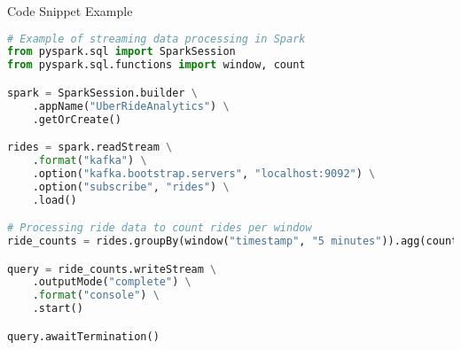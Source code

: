 \documentclass[aspectratio=169]{beamer}
\begin{document}
\begin{frame}[fragile]{Code Snippet Example}
\begin{lstlisting}[language=Python]
# Example of streaming data processing in Spark
from pyspark.sql import SparkSession
from pyspark.sql.functions import window, count

spark = SparkSession.builder \
    .appName("UberRideAnalytics") \
    .getOrCreate()

rides = spark.readStream \
    .format("kafka") \
    .option("kafka.bootstrap.servers", "localhost:9092") \
    .option("subscribe", "rides") \
    .load()

# Processing ride data to count rides per window
ride_counts = rides.groupBy(window("timestamp", "5 minutes")).agg(count("ride_id").alias("total_rides"))

query = ride_counts.writeStream \
    .outputMode("complete") \
    .format("console") \
    .start()

query.awaitTermination()
\end{lstlisting}
\end{frame}
\end{document}
